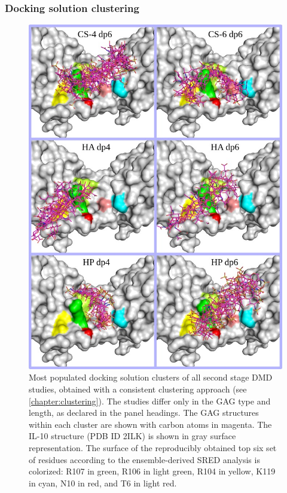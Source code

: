 \subsubsection{Docking solution clustering}

\begin{figure}
\centering
\includegraphics[width=1.0\textwidth]{gfx/dmdil10/2ndstage_allclusters_04.jpg}
\caption[]{
Most populated docking solution clusters of all second stage DMD studies,
obtained with a consistent clustering approach (see \cref{chapter:clustering}).
The studies differ only in the GAG type and length, as declared in the panel
headings. The GAG structures within each cluster are shown with carbon atoms in
magenta. The IL-10 structure (PDB ID 2ILK) is shown in gray surface
representation. The surface of the reproducibly obtained top six set of residues
according to the ensemble-derived SRED analysis is colorized: R107 in green,
R106 in light green, R104 in yellow, K119 in cyan, N10 in red, and T6 in light
red.}
\label{fig:dmdil10:2nd_stage_all_clusters}
\end{figure}



